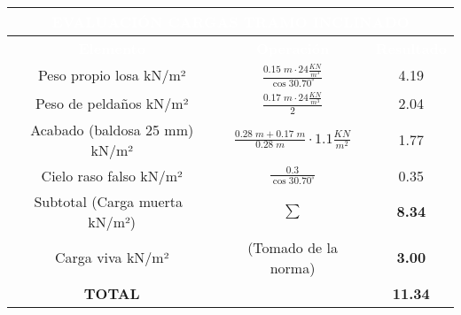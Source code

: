 \documentclass[12pt]{article}
\begin{document}
\begin{table}[H]
\centering

\begin{tabular}{|c|c|c|} 
\hline
\multicolumn{3}{|c|}{{\cellcolor[rgb]{0.227,0.227,0.227}}\textcolor{white}{\textbf{EVALUACIÓN CARGAS TRAMO INCLINADO}}}                                 \\ 
\hline
\rowcolor[rgb]{0.227,0.227,0.227} \textcolor{white}{\textbf{Elemento}} & \textcolor{white}{\textbf{Operación}} & \textcolor{white}{\textbf{Resultado}}  \\ 
\hline
{\cellcolor[rgb]{1 ,1 ,1}}Peso propio losa
  kN/m²           &   $\frac{0.15\;m \cdot 24 \tfrac{KN}{m^3}}{\cos{30.70^{\circ}}}$                                  & 4.19                                 \\ 
\hline
{\cellcolor[rgb]{1,1,1}}Peso de peldaños
  kN/m²           & $\frac{0.17\;m \cdot 24 \tfrac{KN}{m^3}}{2}$                                     & 2.04                                 \\ 
\hline  
{\cellcolor[rgb]{1,1,1}}Acabado (baldosa 25
  mm) kN/m²    &  $\frac{0.28\;m + 0.17\;m}{0.28\;m}\cdot 1.1\tfrac{KN}{m^2}$                                    & 1.77                                   \\ 
\hline
{\cellcolor[rgb]{1,1,1}}Cielo raso falso kN/m²                   & $\frac{0.3}{\cos{30.70^{\circ}}}$                                      & 0.35                                   \\ 
\hline
{\cellcolor[rgb]{1,1,1}}Subtotal (Carga
  muerta~ kN/m²)   & $\mathbf{\sum}$                                    & \textbf{8.34  }                                 \\ 
\hline
{\cellcolor[rgb]{1,1,1}}Carga viva kN/m²                   & (Tomado de la norma)                                     & \textbf{3.00}                                   \\ 
\hline
{\cellcolor[rgb]{1,1,1}}\textbf{TOTAL}                     & ~                                     & \textbf{11.34}                         \\
\hline
\end{tabular}
\end{table}
\end{document}
